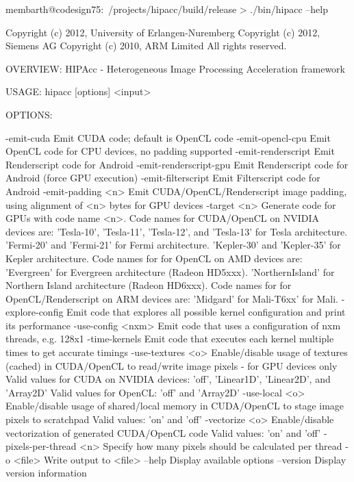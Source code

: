 \lstset{language=bash}
\begin{code}
membarth@codesign75:~/projects/hipacc/build/release > ./bin/hipacc --help

Copyright (c) 2012, University of Erlangen-Nuremberg
Copyright (c) 2012, Siemens AG
Copyright (c) 2010, ARM Limited
All rights reserved.

OVERVIEW: HIPAcc - Heterogeneous Image Processing Acceleration framework

USAGE:  hipacc [options] <input>

OPTIONS:

  -emit-cuda              Emit CUDA code; default is OpenCL code
  -emit-opencl-cpu        Emit OpenCL code for CPU devices, no padding supported
  -emit-renderscript      Emit Renderscript code for Android
  -emit-renderscript-gpu  Emit Renderscript code for Android (force GPU execution)
  -emit-filterscript      Emit Filterscript code for Android
  -emit-padding <n>       Emit CUDA/OpenCL/Renderscript image padding, using alignment of <n> bytes for GPU devices
  -target <n>             Generate code for GPUs with code name <n>.
                          Code names for CUDA/OpenCL on NVIDIA devices are:
                            'Tesla-10', 'Tesla-11', 'Tesla-12', and 'Tesla-13' for Tesla architecture.
                            'Fermi-20' and 'Fermi-21' for Fermi architecture.
                            'Kepler-30' and 'Kepler-35' for Kepler architecture.
                          Code names for for OpenCL on AMD devices are:
                            'Evergreen'      for Evergreen architecture (Radeon HD5xxx).
                            'NorthernIsland' for Northern Island architecture (Radeon HD6xxx).
                          Code names for for OpenCL/Renderscript on ARM devices are:
                            'Midgard' for Mali-T6xx' for Mali.
  -explore-config         Emit code that explores all possible kernel configuration and print its performance
  -use-config <nxm>       Emit code that uses a configuration of nxm threads, e.g. 128x1
  -time-kernels           Emit code that executes each kernel multiple times to get accurate timings
  -use-textures <o>       Enable/disable usage of textures (cached) in CUDA/OpenCL to read/write image pixels - for GPU devices only
                          Valid values for CUDA on NVIDIA devices: 'off', 'Linear1D', 'Linear2D', and 'Array2D'
                          Valid values for OpenCL: 'off' and 'Array2D'
  -use-local <o>          Enable/disable usage of shared/local memory in CUDA/OpenCL to stage image pixels to scratchpad
                          Valid values: 'on' and 'off'
  -vectorize <o>          Enable/disable vectorization of generated CUDA/OpenCL code
                          Valid values: 'on' and 'off'
  -pixels-per-thread <n>  Specify how many pixels should be calculated per thread
  -o <file>               Write output to <file>
  --help                  Display available options
  --version               Display version information
\end{code}


